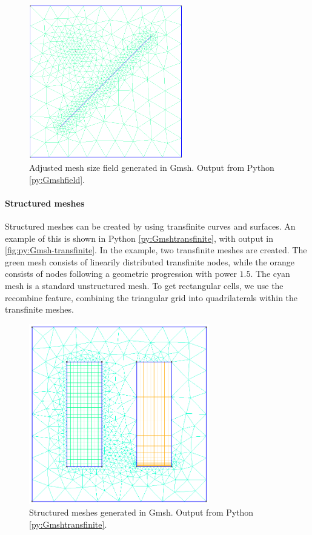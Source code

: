\begin{figure}[htp]
    \centering
    \includegraphics[width=0.6\textwidth]{report/Images/Software/Gmsh examples/gmsh_mesh_size_fields.png}
    \caption[Adjusted mesh size field generated in Gmsh]{Adjusted mesh size field generated in Gmsh. Output from Python \ref{py:Gmshfield}.}
    \label{fig:py:Gmsh-field}
\end{figure}

\paragraph{Structured meshes}
Structured meshes can be created by using transfinite curves and surfaces. An example of this is shown in Python \ref{py:Gmshtransfinite}, with output in \autoref{fig:py:Gmsh-transfinite}. In the example, two transfinite meshes are created. The green mesh consists of linearily distributed transfinite nodes, while the orange consists of nodes following a geometric progression with power $1.5$. The cyan mesh is a standard unstructured mesh. To get rectangular cells, we use the recombine feature, combining the triangular grid into quadrilaterals within the transfinite meshes.

\begin{figure}[htp]
    \centering
    \includegraphics[width=0.7\textwidth]{report/Images/Software/Gmsh examples/gmsh_structured_meshes.png}
    \caption[Structured meshes generated in Gmsh]{Structured meshes generated in Gmsh. Output from Python \ref{py:Gmshtransfinite}.}
    \label{fig:py:Gmsh-transfinite}
\end{figure}

